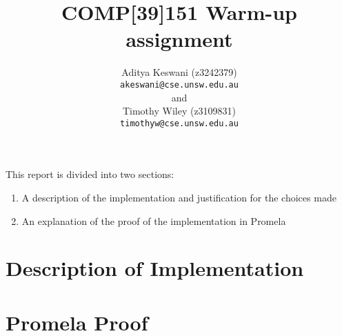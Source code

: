 \documentclass[12pt,a4paper]{scrartcl}
\begin{document}
\title{COMP[39]151 Warm-up assignment}
\author{Aditya Keswani (z3242379) \\ 
        \texttt{akeswani@cse.unsw.edu.au} \\ 
        and \\ 
        Timothy Wiley (z3109831) \\
        \texttt{timothyw@cse.unsw.edu.au} }

\maketitle

This report is divided into two sections:
\begin{enumerate}
    \item A description of the implementation and justification for the choices made
    \item An explanation of the proof of the implementation in Promela
\end{enumerate}

\section{Description of Implementation}

\section{Promela Proof}
\end{document}
